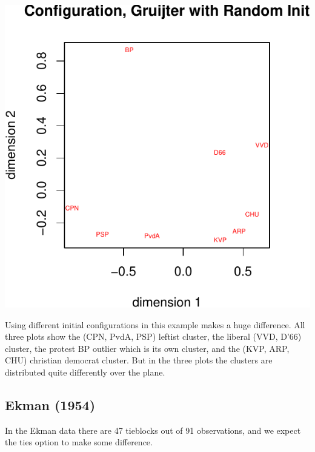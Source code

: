 \documentclass[
  12pt,
]{article}
\begin{document}
\begin{center}\includegraphics{smacofRO_files/figure-latex/gruiterconfs-3} \end{center}

Using different initial configurations in this example makes a huge difference. All three plots
show the (CPN, PvdA, PSP) leftist cluster, the liberal (VVD, D'66) cluster, the protest BP outlier which is its own cluster, and the (KVP, ARP, CHU) christian democrat cluster. But in the three plots the
clusters are distributed quite differently over the plane.

\subsection{Ekman (1954)}\label{ekman_54}

In the Ekman data there are 47 tieblocks out of
91 observations, and we expect the
ties option to make some difference.
\end{document}
